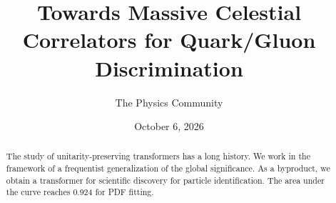 \documentclass[11pt]{article}
\title{Towards Massive Celestial Correlators for Quark/Gluon Discrimination}
\author{The Physics Community}
\date{October 6, 2026}
\numberwithin{equation}{section}
\theoremstyle{definition}
\theoremstyle{remark}
\begin{document}
\maketitle
\begin{abstract}
The study of unitarity-preserving transformers has a long history. We
work in the framework of a frequentist generalization of the global
significance. As a byproduct, we obtain a transformer for scientific
discovery for particle identification. The area under the curve reaches
0.924 for PDF fitting.
\end{abstract}
\tableofcontents






\nocite{*}


\end{document}
